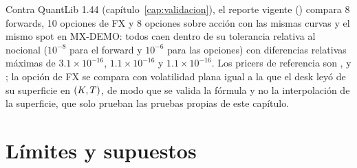 Contra QuantLib 1.44 (capítulo~\ref{cap:validacion}), el reporte vigente
() compara 8 forwards, 10 opciones de FX y 8 opciones sobre
acción con las mismas curvas y el mismo spot en MX-DEMO: todos caen dentro de su tolerancia relativa al
nocional ($10^{-8}$ para el forward y $10^{-6}$ para las opciones) con diferencias relativas máximas de
$3.1\times10^{-16}$, $1.1\times10^{-16}$ y $1.1\times10^{-16}$. Los pricers de referencia son
,  y
; la opción de FX se compara con volatilidad plana igual a
la que el desk leyó de su superficie en $(K,T)$, de modo que se valida la fórmula y no la interpolación de la
superficie, que solo prueban las pruebas propias de este capítulo.

\section{Límites y supuestos}\label{sec:cap04-limites}

